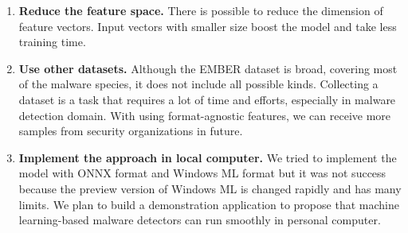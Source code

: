 \begin{enumerate}
    \item \textbf{Reduce the feature space. } There is possible to reduce the dimension of feature vectors. Input vectors with smaller size boost the model and take less training time. 
    \item \textbf{Use other datasets. } Although the EMBER dataset is broad, covering most of the malware species, it does not include all possible kinds. Collecting a dataset is a task that requires a lot of time and efforts, especially in malware detection domain. With using format-agnostic features, we can receive more samples from security organizations in future. 
    \item \textbf{Implement the approach in local computer. } We tried to implement the model with ONNX format and Windows ML format but it was not success because the preview version of Windows ML is changed rapidly and has many limits. We plan to build a demonstration application to propose that machine learning-based malware detectors can run smoothly in personal computer.
\end{enumerate}

